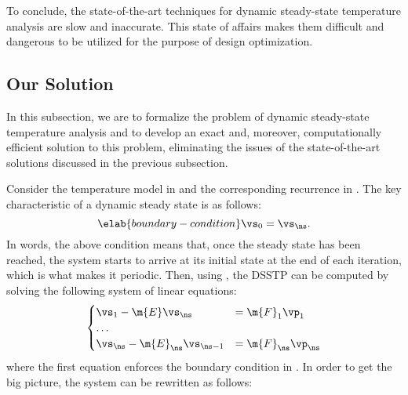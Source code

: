 To conclude, the state-of-the-art techniques for dynamic steady-state
temperature analysis are slow and inaccurate. This state of affairs makes them
difficult and dangerous to be utilized for the purpose of design optimization.

\subsection{Our Solution}

In this subsection, we are to formalize the problem of dynamic steady-state
temperature analysis and to develop an exact and, moreover, computationally
efficient solution to this problem, eliminating the issues of the
state-of-the-art solutions discussed in the previous subsection.

Consider the temperature model in  and the corresponding
recurrence in . The key characteristic of a dynamic steady
state is as follows:
\begin{equation} \elab{boundary-condition}
  \vs_0 = \vs_\ns.
\end{equation}
In words, the above condition means that, once the steady state has been
reached, the system starts to arrive at its initial state at the end of each
iteration, which is what makes it periodic. Then, using , the
\ac{DSSTP} can be computed by solving the following system of linear equations:
\[
  \begin{cases}
    \vs_1 - \m{E} \vs_\ns & = \m{F}_1 \vp_1 \\
    \dots \\
    \vs_\ns - \m{E}_\ns \vs_{\ns - 1} & = \m{F}_\ns \vp_\ns
  \end{cases}
\]
where the first equation enforces the boundary condition in
. In order to get the big picture, the system can be
rewritten as follows:
